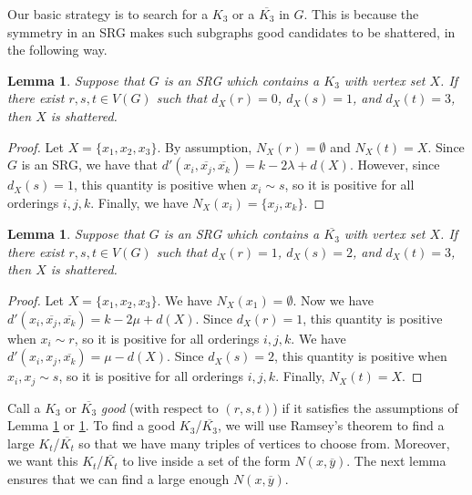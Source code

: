 \documentclass{article}
\newtheorem{lemma}[thm]{Lemma}
\theoremstyle{definition}
\begin{document}
Our basic strategy is to search for a $K_3$ or a $\overline{K_3}$ in $G$. This is because the symmetry in an SRG makes such subgraphs good candidates to be shattered, in the following way.

\begin{lemma} \label{Lemma triangle}
    Suppose that $G$ is an SRG which contains a $K_3$ with vertex set $X$. If there exist $r,s,t\in V(G)$ such that $d_X(r)=0$, $d_X(s)=1$, and $d_X(t)=3$, then $X$ is shattered.
\end{lemma}
\begin{proof}
    Let $X=\{x_1,x_2,x_3\}$. By assumption, $N_X(r)=\emptyset$ and $N_X(t)=X$. Since $G$ is an SRG, we have that $d'(x_i,\overline{x_j},\overline{x_k})=k-2\lambda+d(X)$. However, since $d_X(s)=1$, this quantity is positive when $x_i\sim s$, so it is positive for all orderings $i,j,k$. Finally, we have $N_X(x_i)=\{x_j,x_k\}$. 
\end{proof}

\begin{lemma} \label{Lemma anti triangle}
    Suppose that $G$ is an SRG which contains a $\overline{K_3}$ with vertex set $X$. If there exist $r,s,t\in V(G)$ such that $d_X(r)=1$, $d_X(s)=2$, and $d_X(t)=3$, then $X$ is shattered.
\end{lemma}
\begin{proof}
    Let $X=\{x_1,x_2,x_3\}$. We have $N_X(x_1)=\emptyset$. Now we have $d'(x_i,\overline{x_j},\overline{x_k})=k-2\mu+d(X).$ Since $d_X(r)=1$, this quantity is positive when $x_i\sim r$, so it is positive for all orderings $i,j,k$. We have $d'(x_i,x_j,\overline{x_k})=\mu-d(X)$. Since $d_X(s)=2$, this quantity is positive when $x_i,x_j\sim s$, so it is positive for all orderings $i,j,k$. Finally, $N_X(t)=X$. 
\end{proof}

Call a $K_3$ or $\overline{K_3}$ \textit{good} (with respect to $(r,s,t)$) if it satisfies the assumptions of Lemma \ref{Lemma triangle} or \ref{Lemma anti triangle}. To find a good $K_3$/$\overline{K_3}$, we will use Ramsey's theorem to find a large $K_t$/$\overline{K_t}$ so that we have many triples of vertices to choose from. Moreover, we want this $K_t$/$\overline{K_t}$ to live inside a set of the form $N(x,\overline y)$. The next lemma ensures that we can find a large enough $N(x,\overline y)$.
\end{document}
